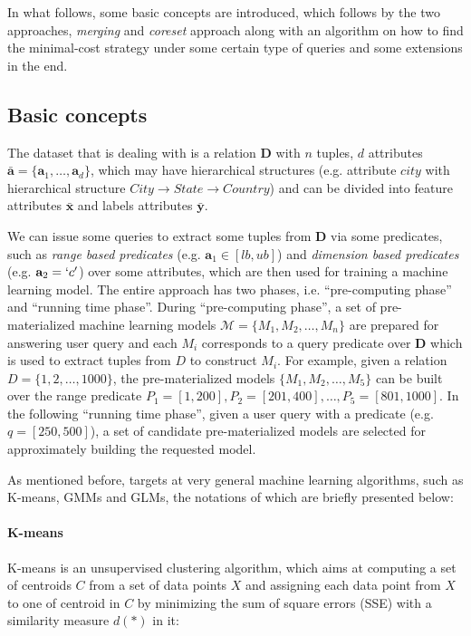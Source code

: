 In what follows, some basic concepts are introduced, which follows by the two approaches, {\em merging} and {\em coreset} approach along with an algorithm on how to find the minimal-cost strategy under some certain type of queries and some extensions in the end.


\subsection{Basic concepts}
The dataset that \cite{hasani2018efficient} is dealing with is a relation $\textbf{D}$ with $n$ tuples, $d$ attributes $\bar{\textbf{a}} = \{\textbf{a}_1, \dots, \textbf{a}_d\}$, which may have hierarchical structures (e.g. attribute $city$ with hierarchical structure $City \rightarrow State \rightarrow Country$) and can be divided into feature attributes $\bar{\textbf{x}}$ and labels attributes $\bar{\textbf{y}}$.

We can issue some queries to extract some tuples from $\textbf{D}$ via some predicates, such as {\em range based predicates} (e.g. $\textbf{a}_1 \in [lb, ub]$) and {\em dimension based predicates} (e.g. $\textbf{a}_2 = `c'$) over some attributes, which are then used for training a machine learning model. The entire approach has two phases, i.e. ``pre-computing phase'' and ``running time phase''. During ``pre-computing phase'', a set of pre-materialized machine learning models $\mathcal{M} = \{M_1, M_2, \dots, M_n\}$ are prepared for answering user query and each $M_i$ corresponds to a query predicate over $\textbf{D}$ which is used to extract tuples from $D$ to construct $M_i$. For example, given a relation $D=\{1,2,\dots, 1000\}$, the pre-materialized models $\{M_1, M_2, \dots, M_5\}$ can be built over the range predicate $P_1 = [1, 200], P_2 = [201, 400], \dots, P_5 = [801, 1000]$.
In the following ``running time phase'', given a user query with a predicate (e.g. $q=[250, 500]$), a set of candidate pre-materialized models are selected for approximately building the requested model.

As mentioned before, \cite{hasani2018efficient} targets at very general machine learning algorithms, such as K-means, GMMs and GLMs, the notations of which are briefly presented below:

\paragraph{K-means} K-means is an unsupervised clustering algorithm, which aims at computing a set of centroids $C$ from a set of data points $X$ and assigning each data point from $X$ to one of centroid in $C$ by minimizing the sum of square errors (SSE) with a similarity measure $d(*)$ in it:

